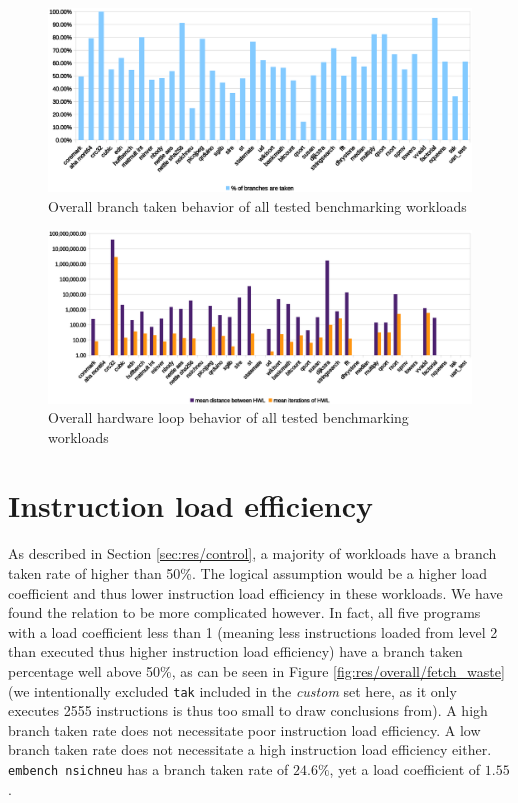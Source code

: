 \documentclass[../bachelor_paper.tex]{subfiles}
\begin{document}
\begin{figure}
    \centering
    \includegraphics[width=\textwidth]{img/graph/overall_branch_tk.eps}
    \caption{Overall branch taken behavior of all tested benchmarking workloads}
    \label{fig:res/overall/branch_tk}
\end{figure}

\begin{figure}
    \centering
    \includegraphics[width=\textwidth]{img/graph/overall_hwl.eps}
    \caption{Overall hardware loop behavior of all tested benchmarking workloads}
    \label{fig:res/overall/hwl}
\end{figure}

\section{Instruction load efficiency}
As described in Section \ref{sec:res/control}, a majority of workloads have a branch taken rate of higher than 50\%. The logical assumption would be a higher load coefficient and thus lower instruction load efficiency in these workloads. We have found the relation to be more complicated however. In fact, all five programs with a load coefficient less than 1 (meaning less instructions loaded from level 2 than executed thus higher instruction load efficiency) have a branch taken percentage well above 50\%, as can be seen in Figure \ref{fig:res/overall/fetch_waste} (we intentionally excluded \texttt{tak} included in the \emph{custom} set here, as it only executes 2555 instructions is thus too small to draw conclusions from). A high branch taken rate does not necessitate poor instruction load efficiency. A low branch taken rate does not necessitate a high instruction load efficiency either. \texttt{embench nsichneu} has a branch taken rate of $24.6\%$, yet a load coefficient of $1.55$.
\end{document}
